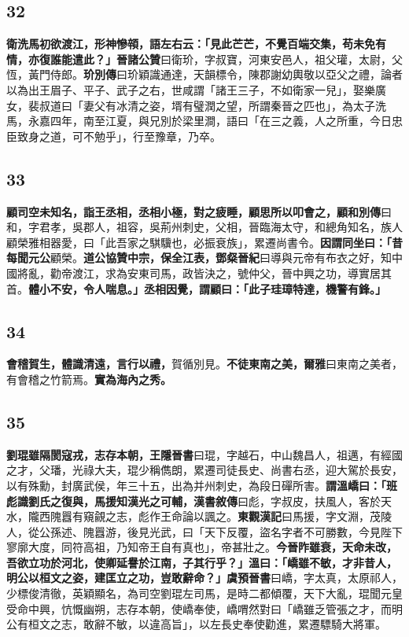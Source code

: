 \subsection*{32}

\textbf{衛洗馬初欲渡江，形神慘顇，語左右云：「見此芒芒，不覺百端交集，苟未免有情，亦復誰能遣此？」}{\footnotesize \textbf{晉諸公贊}曰衛玠，字叔寶，河東安邑人，祖父瓘，太尉，父恆，黃門侍郎。\textbf{玠別傳}曰玠穎識通達，天韻標令，陳郡謝幼輿敬以亞父之禮，論者以為出王眉子、平子、武子之右，世咸謂「諸王三子，不如衛家一兒」，娶樂廣女，裴叔道曰「妻父有冰清之姿，壻有璧潤之望，所謂秦晉之匹也」，為太子洗馬，永嘉四年，南至江夏，與兄別於梁里澗，語曰「在三之義，人之所重，今日忠臣致身之道，可不勉乎」，行至豫章，乃卒。}

\subsection*{33}

\textbf{顧司空未知名，詣王丞相，丞相小極，對之疲睡，顧思所以叩會之，}{\footnotesize \textbf{顧和別傳}曰和，字君孝，吳郡人，祖容，吳荊州刺史，父相，晉臨海太守，和總角知名，族人顧榮雅相器愛，曰「此吾家之騏驥也，必振衰族」，累遷尚書令。}\textbf{因謂同坐曰：「昔每聞元公}{\footnotesize 顧榮。}\textbf{道公協贊中宗，保全江表，}{\footnotesize \textbf{鄧粲晉紀}曰導與元帝有布衣之好，知中國將亂，勸帝渡江，求為安東司馬，政皆決之，號仲父，晉中興之功，導實居其首。}\textbf{體小不安，令人喘息。」丞相因覺，謂顧曰：「此子珪璋特達，機警有鋒。」}

\subsection*{34}

\textbf{會稽賀生，體識清遠，言行以禮，}{\footnotesize 賀循別見。}\textbf{不徒東南之美，}{\footnotesize \textbf{爾雅}曰東南之美者，有會稽之竹箭焉。}\textbf{實為海內之秀。}

\subsection*{35}

\textbf{劉琨雖隔閡寇戎，志存本朝，}{\footnotesize \textbf{王隱晉書}曰琨，字越石，中山魏昌人，祖邁，有經國之才，父璠，光祿大夫，琨少稱儁朗，累遷司徒長史、尚書右丞，迎大駕於長安，以有殊勳，封廣武侯，年三十五，出為并州刺史，為段日磾所害。}\textbf{謂溫嶠曰：「班彪識劉氏之復與，馬援知漢光之可輔，}{\footnotesize \textbf{漢書敘傳}曰彪，字叔皮，扶風人，客於天水，隴西隗囂有窺覦之志，彪作王命論以諷之。\textbf{東觀漢記}曰馬援，字文淵，茂陵人，從公孫述、隗囂游，後見光武，曰「天下反覆，盜名字者不可勝數，今見陛下寥廓大度，同符高祖，乃知帝王自有真也」，帝甚壯之。}\textbf{今晉阼雖衰，天命未改，吾欲立功於河北，使卿延譽於江南，子其行乎？」溫曰：「嶠雖不敏，才非昔人，明公以桓文之姿，建匡立之功，豈敢辭命？」}{\footnotesize \textbf{虞預晉書}曰嶠，字太真，太原祁人，少標俊清徹，英穎顯名，為司空劉琨左司馬，是時二都傾覆，天下大亂，琨聞元皇受命中興，忼慨幽朔，志存本朝，使嶠奉使，嶠喟然對曰「嶠雖乏管張之才，而明公有桓文之志，敢辭不敏，以違高旨」，以左長史奉使勸進，累遷驃騎大將軍。}

